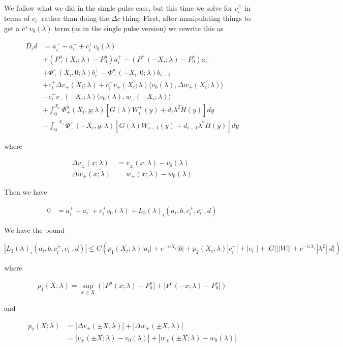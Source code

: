 \documentclass[12pt]{article}
\begin{document}
\begin{enumerate}
We follow what we did in the single pulse case, but this time we solve for $c_i^+$ in terms of $c_i^-$ rather than doing the $\Delta c$ thing. First, after manipulating things to get a $c^+ v_0(\lambda)$ term (as in the single pulse version) we rewrite this as

\begin{align*}
D_i d &= a_i^+ - a_i^- + c_i^+ v_0(\lambda) \\
&+ (P^u_+(X_i; \lambda) - P_0^u)a_i^+ - (P^s_-(-X_i; \lambda) - P_0^s)a_i^- \\
&+ \Phi^s_+(X_i, 0; \lambda)b_i^+ - \Phi^u_-(-X_i, 0; \lambda)b_{i-1}^- \\
&+ c_i^+ \Delta v_+(X_i; \lambda) + c_i^+ v_+(X_i; \lambda) \langle v_0(\lambda), \Delta w_+(X_i; \lambda) \rangle \\
&- c_i^- v_-(-X_i; \lambda) \langle v_0(\lambda), w_-(-X_i; \lambda) \rangle \\
&+ \int_0^{X_i} \Phi^u_+(X_i, y; \lambda) [ G(\lambda)W_i^+(y) + d_i \lambda^2 \tilde{H}(y) ] dy \\
&- \int_0^{-X_i} \Phi^s_-(-X_i, y; \lambda) [ G(\lambda)W_{i-1}^-(y) + d_{i-1} \lambda^2 \tilde{H}(y) ] dy
\end{align*}

where

\begin{align*}
\Delta v_\pm(x; \lambda) &= v_\pm(x; \lambda) - v_0(\lambda) \\
\Delta w_\pm(x; \lambda) &= w_\pm(x; \lambda) - w_0(\lambda)
\end{align*}

Then we have 

\begin{align*}
0 &= a_i^+ - a_i^- + c_i^+ v_0(\lambda) + L_3(\lambda)_i(a_i, b, c_i^+, c_i^-, d)
\end{align*}

We have the bound 

\[
|L_3(\lambda)_i(a_i, b, c_i^+, c_i^-, d)| \leq C ( p_1(X_i; \lambda)|a_i|
+ e^{-\alpha X_i}|b| + p_2(X_i; \lambda)|c_i^+| + |c_i^-| + |G| ||W|| + e^{-\tilde{\alpha} X_i} |\lambda^2| |d| )
\]

where

\begin{align*}
p_1(X;\lambda) = \sup_{x \geq X} (|P^u(x;\lambda) - P_0^u| + |P^s(-x;\lambda) - P_0^s|)
\end{align*}

and

\begin{align*}
p_2(X; \lambda) &= |\Delta v_\pm(\pm X, \lambda)| + |\Delta w_\pm(\pm X, \lambda)|\\
&= |v_\pm(\pm X; \lambda) - v_0(\lambda)| + |w_\pm(\pm X; \lambda) - w_0(\lambda)|
\end{align*}


\end{enumerate}
\end{document}
